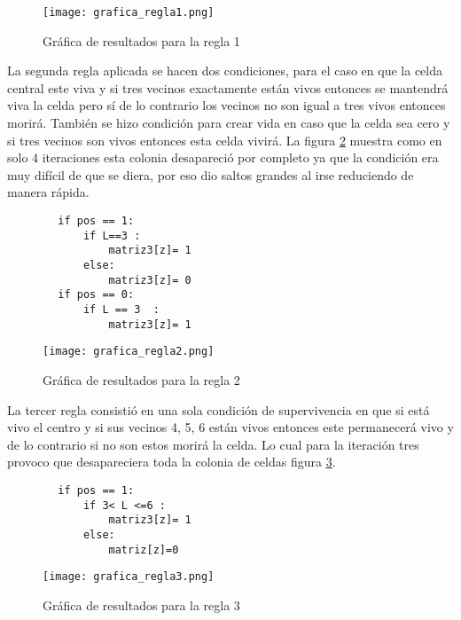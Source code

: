 \documentclass[a4paper, 11pt]{article}
\begin{document}
\begin{figure}[H]
  \centering
  \caption{Gráfica de resultados para la regla 1}  
  \texttt{[image: grafica\_regla1.png]}
  \label{regla1}
\end{figure}

La segunda regla aplicada se hacen dos condiciones, para el caso en que la celda central este viva y si tres vecinos exactamente están vivos entonces se mantendrá viva la celda pero sí de lo contrario los vecinos no son igual a tres vivos entonces morirá. También se hizo condición para crear vida en caso que la celda sea cero y si tres vecinos son vivos entonces esta celda vivirá.
La figura \ref{regla2} muestra como en solo 4 iteraciones esta colonia desapareció por completo ya que la condición era muy difícil de que se diera, por eso dio saltos grandes al irse reduciendo de manera rápida.
\begin{verbatim}
        if pos == 1:  
            if L==3 : 
                matriz3[z]= 1
            else:
                matriz3[z]= 0
        if pos == 0:  
            if L == 3  :  
                matriz3[z]= 1
\end{verbatim}
\begin{figure}[H]
  \centering      
  \caption{Gráfica de resultados para la regla 2}  
  \texttt{[image: grafica\_regla2.png]}
  \label{regla2}
\end{figure}


La tercer regla consistió en una sola condición de supervivencia en que si está vivo el centro y si sus vecinos 4, 5, 6 están vivos entonces este permanecerá vivo y de lo contrario si no son estos morirá la celda. Lo cual para la iteración tres provoco que desapareciera toda la colonia de celdas figura \ref{regla3}.
\begin{verbatim}
        if pos == 1:  
            if 3< L <=6 : 
                matriz3[z]= 1           
            else:
                matriz[z]=0
\end{verbatim}
\begin{figure}[H]
  \centering      
  \caption{Gráfica de resultados para la regla 3}  
  \texttt{[image: grafica\_regla3.png]}
  \label{regla3}
\end{figure}
\end{document}
